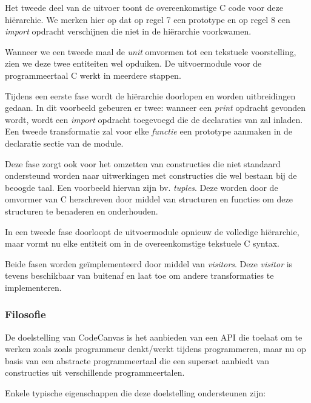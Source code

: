 Het tweede deel van de uitvoer toont de overeenkomstige C code voor deze
hi\"erarchie. We merken hier op dat op regel 7 een prototype en op regel 8 een
\emph{import} opdracht verschijnen die niet in de hi\"erarchie voorkwamen.

Wanneer we een tweede maal de \emph{unit} omvormen tot een tekstuele
voorstelling, zien we deze twee entiteiten wel opduiken. De uitvoermodule voor
de programmeertaal C werkt in meerdere stappen.

Tijdens een eerste fase wordt de hi\"erarchie doorlopen en worden uitbreidingen
gedaan. In dit voorbeeld gebeuren er twee: wanneer een \emph{print} opdracht
gevonden wordt, wordt een \emph{import} opdracht toegevoegd die de declaraties
van  zal inladen. Een tweede transformatie zal voor elke
\emph{functie} een prototype aanmaken in de declaratie sectie van de module.

Deze fase zorgt ook voor het omzetten van constructies die niet standaard
ondersteund worden naar uitwerkingen met constructies die wel bestaan bij de
beoogde taal. Een voorbeeld hiervan zijn bv. \emph{tuples}. Deze worden door de
omvormer van C herschreven door middel van structuren en functies om deze
structuren te benaderen en onderhouden.

In een tweede fase doorloopt de uitvoermodule opnieuw de volledige
hi\"erarchie, maar vormt nu elke entiteit om in de overeenkomstige tekstuele C
syntax.

Beide fasen worden ge\"implementeerd door middel van \emph{visitors}. Deze
\emph{visitor} is tevens beschikbaar van buitenaf en laat toe om andere
transformaties te implementeren.

\subsubsection{Filosofie}

De doelstelling van CodeCanvas is het aanbieden van een API die toelaat om te
werken zoals zoals programmeur denkt/werkt tijdens programmeren, maar nu op
basis van een abstracte programmeertaal die een superset aanbiedt van
constructies uit verschillende programmeertalen.

Enkele typische eigenschappen die deze doelstelling ondersteunen zijn:


